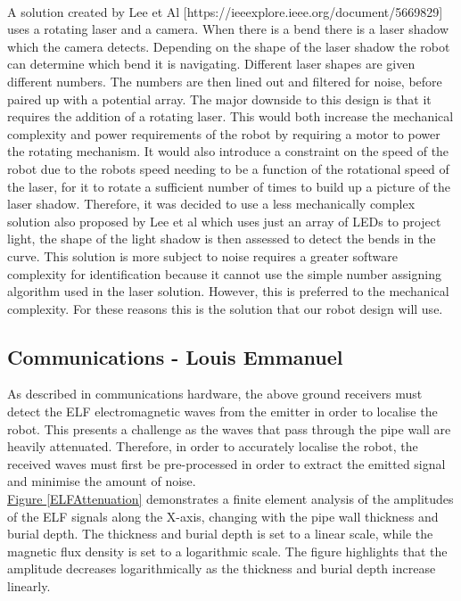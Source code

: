 \documentclass[11pt]{article}		%
\begin{document}
        \\
        A solution created by Lee et Al [https://ieeexplore.ieee.org/document/5669829] uses a rotating laser and a camera. 
        When there is a bend there is a laser shadow which the camera detects. 
        Depending on the shape of the laser shadow the robot can determine which bend it is navigating. 
       	Different laser shapes are given different numbers. 
       	The numbers are then lined out and filtered for noise, before paired up with a potential array. 
       	The major downside to this design is that it requires the addition of a rotating laser. 
       	This would both increase the mechanical complexity and power requirements of the robot by requiring a motor to power the rotating mechanism. 
       	It would also introduce a constraint on the speed of the robot due to the robots speed needing to be a function of the rotational speed of the laser, for it to rotate a sufficient number of times to build up a picture of the laser shadow. 
       	Therefore, it was decided to use a less mechanically complex solution also proposed by Lee et al which uses just an array of LEDs to project light, the shape of the light shadow is then assessed to detect the bends in the curve. 
       	This solution is more subject to noise requires a greater software complexity for identification because it cannot use the simple number assigning algorithm used in the laser solution. 
       	However, this is preferred to the mechanical complexity. 
       	For these reasons this is the solution that our robot design will use.

		\subsection[Communications]{Communications - Louis Emmanuel}
		
		As described in communications hardware, the above ground receivers must detect the ELF electromagnetic waves from the emitter in order to localise the robot.
		This presents a challenge as the waves that pass through the pipe wall are heavily attenuated. 
		Therefore, in order to accurately localise the robot, the received waves must first be pre-processed in order to extract the emitted signal and minimise the amount of noise.
		\\
	    \hspace*{3ex}\hyperref[ELFAttenuation]{Figure \ref*{ELFAttenuation}}  demonstrates a finite element analysis of the amplitudes of the ELF signals along the X-axis, changing with the pipe wall thickness and burial depth.
	    The thickness and burial depth is set to a linear scale, while the magnetic flux density is set to a logarithmic scale.
	    The figure highlights that the amplitude decreases logarithmically as the thickness and burial depth increase linearly.
	    
\end{document}
